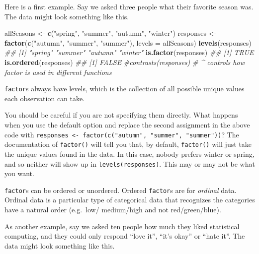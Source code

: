 \documentclass[12pt,krantz2]{krantz}
\makeatletter
\newenvironment{Shaded}{\begin{snugshade}}{\end{snugshade}}
\newcommand{\CommentTok}[1]{\textcolor[rgb]{0.37,0.37,0.37}{\textit{#1}}}
\newcommand{\DataTypeTok}[1]{\textcolor[rgb]{0.27,0.27,0.27}{#1}}
\newcommand{\KeywordTok}[1]{\textcolor[rgb]{0.27,0.27,0.27}{\textbf{#1}}}
\newcommand{\NormalTok}[1]{#1}
\newcommand{\StringTok}[1]{\textcolor[rgb]{0.5,0.5,0.5}{#1}}
\newenvironment{kframe}{%
\medskip{}
\setlength{\fboxsep}{.8em}
 \def\at@end@of@kframe{}%
 \ifinner\ifhmode%
  \def\at@end@of@kframe{\end{minipage}}%
  \begin{minipage}{\columnwidth}%
 \fi\fi%
 \def\FrameCommand##1{\hskip\@totalleftmargin \hskip-\fboxsep
 \colorbox{shadecolor}{##1}\hskip-\fboxsep
     \hskip-\linewidth \hskip-\@totalleftmargin \hskip\columnwidth}%
 \MakeFramed {\advance\hsize-\width
   \@totalleftmargin\z@ \linewidth\hsize
   \@setminipage}}%
 {\par\unskip\endMakeFramed%
 \at@end@of@kframe}
\renewenvironment{Shaded}{\begin{kframe}}{\end{kframe}}
\makeatother
\begin{document}
Here is a first example. Say we asked three people what their favorite season was. The data might look something like this.

\begin{Shaded}
\begin{Highlighting}[]
\NormalTok{allSeasons <-}\StringTok{ }\KeywordTok{c}\NormalTok{(}\StringTok{"spring"}\NormalTok{, }\StringTok{"summer"}\NormalTok{, }\StringTok{"autumn"}\NormalTok{, }\StringTok{"winter"}\NormalTok{)}
\NormalTok{responses <-}\StringTok{ }\KeywordTok{factor}\NormalTok{(}\KeywordTok{c}\NormalTok{(}\StringTok{"autumn"}\NormalTok{, }\StringTok{"summer"}\NormalTok{, }\StringTok{"summer"}\NormalTok{), }
                    \DataTypeTok{levels =}\NormalTok{ allSeasons)}
\KeywordTok{levels}\NormalTok{(responses)}
\CommentTok{## [1] "spring" "summer" "autumn" "winter"}
\KeywordTok{is.factor}\NormalTok{(responses)}
\CommentTok{## [1] TRUE}
\KeywordTok{is.ordered}\NormalTok{(responses)}
\CommentTok{## [1] FALSE}
\CommentTok{#contrasts(responses) }
\CommentTok{# ^ controls how factor is used in different  functions}
\end{Highlighting}
\end{Shaded}

\texttt{factor}s always have levels, which is the collection of all possible unique values each observation can take.

\begin{rmd-caution}
You should be careful if you are not specifying them directly. What happens when you use the default option and replace the second assignment in the above code with \texttt{responses\ \textless{}-\ factor(c("autumn",\ "summer",\ "summer"))}? The documentation of \texttt{factor()} will tell you that, by default, \texttt{factor()} will just take the unique values found in the data. In this case, nobody prefers winter or spring, and so neither will show up in \texttt{levels(responses)}. This may or may not be what you want.

\end{rmd-caution}

\texttt{factor}s can be ordered or unordered. Ordered \texttt{factor}s are for \emph{ordinal} data. Ordinal data is a particular type of categorical data that recognizes the categories have a natural order (e.g.~low/ medium/high and not red/green/blue).

As another example, say we asked ten people how much they liked statistical computing, and they could only respond ``love it'', ``it's okay'' or ``hate it''. The data might look something like this.
\end{document}
